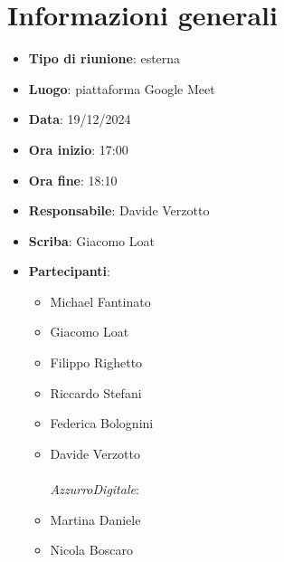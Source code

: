 


\section{Informazioni generali}

\begin{itemize}
    \item \textbf{Tipo di riunione}: esterna
    \item \textbf{Luogo}: piattaforma Google Meet
    \item \textbf{Data}: 19/12/2024
    \item \textbf{Ora inizio}: 17:00
    \item \textbf{Ora fine}: 18:10
    \item \textbf{Responsabile}: Davide Verzotto
    \item \textbf{Scriba}: Giacomo Loat
    \item \textbf{Partecipanti}:
    \begin{itemize}
        \item Michael Fantinato
        \item Giacomo Loat
        \item Filippo Righetto
        \item Riccardo Stefani
        \item Federica Bolognini
        \item Davide Verzotto \\ \\
        \emph{AzzurroDigitale}:
        \item Martina Daniele
        \item Nicola Boscaro
    \end{itemize}
\end{itemize}
